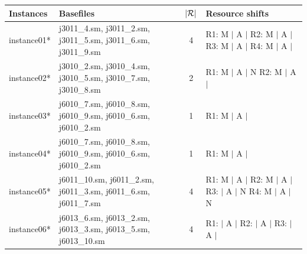 \begin{table}[p]
    \centering
    \begin{tabularx}{0.88\textwidth}{lXcX}
        \toprule
        \textbf{Instances} & \textbf{Basefiles} & $|\mathcal{R}|$ & \textbf{Resource shifts} \\
        \midrule
        instance01* & j3011\_4.sm, j3011\_2.sm, j3011\_5.sm, j3011\_6.sm, j3011\_9.sm
                    & 4 
                    & R1: M $|$ A $|$  \newline
                      R2: M $|$ A $|$  \newline
                      R3: M $|$ A $|$  \newline
                      R4: M $|$ A $|$
                    \\
                    \cmidrule[0.01em](lr){1-4}
        instance02* & j3010\_2.sm, j3010\_4.sm, j3010\_5.sm, j3010\_7.sm, j3010\_8.sm
                    & 2 
                    & R1: M $|$ A $|$ N \newline
                      R2: M $|$ A $|$
                    \\
                    \cmidrule[0.01em](lr){1-4}
        instance03* & j6010\_7.sm, j6010\_8.sm, j6010\_9.sm, j6010\_6.sm, j6010\_2.sm 
                    & 1 
                    & R1: M $|$ A $|$ 
                    \\
                    \cmidrule[0.01em](lr){1-4}
        instance04* & j6010\_7.sm, j6010\_8.sm, j6010\_9.sm, j6010\_6.sm, j6010\_2.sm
                    & 1 
                    & R1: M $|$ A $|$
                    \\
                    \cmidrule[0.01em](lr){1-4}
        instance05* & j6011\_10.sm, j6011\_2.sm, j6011\_3.sm, j6011\_6.sm, j6011\_7.sm
                    & 4 
                    & R1: M $|$ A $|$ \newline
                      R2: M $|$ A $|$ \newline
                      R3: \phantom{M} $|$ A $|$ N \newline
                      R4: M $|$ A $|$ N
                    \\
                    \cmidrule[0.01em](lr){1-4}
        instance06* & j6013\_6.sm, j6013\_2.sm, j6013\_3.sm, j6013\_5.sm, j6013\_10.sm
                    & 4 
                    & R1: \phantom{M} $|$ A $|$ \newline
                      R2: \phantom{M} $|$ A $|$ \newline
                      R3: \phantom{M} $|$ A $|$ \newline

\end{tabularx}
\end{table}
